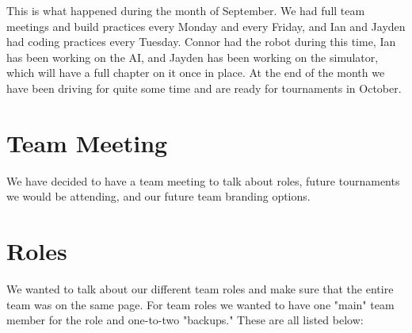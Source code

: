 \begin{center}
\end{center}
This is what happened during the month of September. We had full team meetings and build practices every Monday and every Friday, and Ian and Jayden had coding practices every Tuesday. Connor had the robot during this time, Ian has been working on the AI, and Jayden has been working on the simulator, which will have a full chapter on it once in place. At the end of the month we have been driving for quite some time and are ready for tournaments in October.

\section*{Team Meeting}
We have decided to have a team meeting to talk about roles, future tournaments we would be attending, and our future team branding options. 
\section*{Roles}
We wanted to talk about our different team roles and make sure that the entire team was on the same page. For team roles we wanted to have one "main" team member for the role and one-to-two "backups." These are all listed below:
